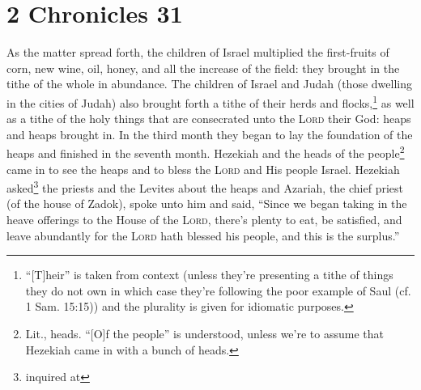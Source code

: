 \section{2 Chronicles 31}\label{2 Chronicles 31}
\begin{enumerate}
     As the matter spread forth, the children of Israel multiplied the first-fruits of corn, new wine, oil, honey, and all the increase of the field: they brought in the tithe of the whole in abundance.%
     The children of Israel and Judah (those dwelling in the cities of Judah) also brought forth a tithe of their herds and flocks,\footnote{``[T]heir'' is taken from context (unless they're presenting a tithe of things they do not own in which case they're following the poor example of Saul (cf. 1 Sam. 15:15)) and the plurality is given for idiomatic purposes.} as well as a tithe of the holy things that are consecrated unto the \textsc{Lord} their God: heaps and heaps brought in.%
     In the third month they began to lay the foundation of the heaps and finished in the seventh month.%
     Hezekiah and the heads of the people\footnote{Lit., heads. ``[O]f the people'' is understood, unless we're to assume that Hezekiah came in with a bunch of heads.} came in to see the heaps and to bless the \textsc{Lord} and His people Israel.%
     Hezekiah asked\footnote{inquired at} the priests and the Levites about the heaps%
     and Azariah, the chief priest (of the house of Zadok), spoke unto him and said, ``Since we began taking in the heave offerings to the House of the \textsc{Lord}, there's plenty to eat, be satisfied, and leave abundantly for the \textsc{Lord} hath blessed his people, and this is the surplus.''%
\end{enumerate}
